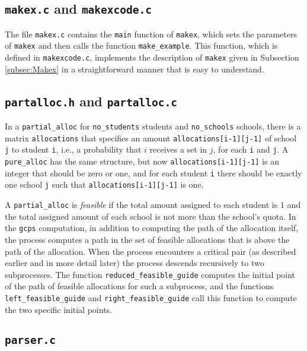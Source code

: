 \documentclass[12pt]{article}
\theoremstyle{definition}
\begin{document}
\begin{appendix}
\subsection{\texttt{makex.c} and \texttt{makexcode.c}}

The file \texttt{makex.c} contains the \texttt{main} function of
\texttt{makex}, which sets the parameters of \texttt{makex} and then
calls the function \texttt{make\_example}.  This function, which is
defined in \texttt{makexcode.c}, implements the description of
\texttt{makex} given in Subsection \ref{subsec:Makex} in a
straightforward manner that is easy to understand.

\subsection{\texttt{partalloc.h} and \texttt{partalloc.c}}

In a \texttt{partial\_alloc} for \texttt{no\_students} students and
\texttt{no\_schools} schools, there is a matrix \texttt{allocations}
that specifies an amount \texttt{allocations[i-1][j-1]} of school
\texttt{j} to student \texttt{i}, i.e., a probability that $i$
receives a set in $j$, for each \texttt{i} and \texttt{j}.  A
\texttt{pure\_alloc} has the same structure, but now
\texttt{allocations[i-1][j-1]} is an integer that should be zero or
one, and for each student \texttt{i} there should be exactly one
school \texttt{j} such that \texttt{allocations[i-1][j-1]} is one.

A \texttt{partial\_alloc} is \emph{feasible} if the total amount
assigned to each student is $1$ and the total assigned amount of each
school is not more than the school's quota.  In the \texttt{gcps}
computation, in addition to computing the path of the allocation
itself, the process computes a path in the set of feasible allocations
that is above the path of the allocation.  When the process encounters
a critical pair (as described earlier and in more detail later) the
process descends recursively to two subprocesses.  The function
\texttt{reduced\_feasible\_guide} computes the initial point of the
path of feasible allocations for such a subprocess, and the functions
\texttt{left\_feasible\_guide} and \texttt{right\_feasible\_guide}
call this function to compute the two specific initial points.

\subsection{\texttt{parser.c}}


\end{appendix}
\end{document}

